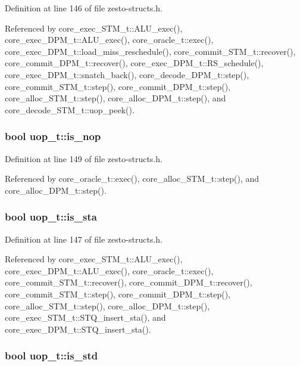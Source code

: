 Definition at line 146 of file zesto-structs.h.

Referenced by core\_\-exec\_\-STM\_\-t::ALU\_\-exec(), core\_\-exec\_\-DPM\_\-t::ALU\_\-exec(), core\_\-oracle\_\-t::exec(), core\_\-exec\_\-DPM\_\-t::load\_\-miss\_\-reschedule(), core\_\-commit\_\-STM\_\-t::recover(), core\_\-commit\_\-DPM\_\-t::recover(), core\_\-exec\_\-DPM\_\-t::RS\_\-schedule(), core\_\-exec\_\-DPM\_\-t::snatch\_\-back(), core\_\-decode\_\-DPM\_\-t::step(), core\_\-commit\_\-STM\_\-t::step(), core\_\-commit\_\-DPM\_\-t::step(), core\_\-alloc\_\-STM\_\-t::step(), core\_\-alloc\_\-DPM\_\-t::step(), and core\_\-decode\_\-STM\_\-t::uop\_\-peek().
\subsubsection[{is\_\-nop}]{\setlength{\rightskip}{0pt plus 5cm}bool {\bf uop\_\-t::is\_\-nop}}\label{structuop__t_56a6fccbcaa70ed56ccb4fa52fe57cb0}




Definition at line 149 of file zesto-structs.h.

Referenced by core\_\-oracle\_\-t::exec(), core\_\-alloc\_\-STM\_\-t::step(), and core\_\-alloc\_\-DPM\_\-t::step().
\subsubsection[{is\_\-sta}]{\setlength{\rightskip}{0pt plus 5cm}bool {\bf uop\_\-t::is\_\-sta}}\label{structuop__t_eec85d8cffdbdff59e335df7cf38174a}




Definition at line 147 of file zesto-structs.h.

Referenced by core\_\-exec\_\-STM\_\-t::ALU\_\-exec(), core\_\-exec\_\-DPM\_\-t::ALU\_\-exec(), core\_\-oracle\_\-t::exec(), core\_\-commit\_\-STM\_\-t::recover(), core\_\-commit\_\-DPM\_\-t::recover(), core\_\-commit\_\-STM\_\-t::step(), core\_\-commit\_\-DPM\_\-t::step(), core\_\-alloc\_\-STM\_\-t::step(), core\_\-alloc\_\-DPM\_\-t::step(), core\_\-exec\_\-STM\_\-t::STQ\_\-insert\_\-sta(), and core\_\-exec\_\-DPM\_\-t::STQ\_\-insert\_\-sta().
\subsubsection[{is\_\-std}]{\setlength{\rightskip}{0pt plus 5cm}bool {\bf uop\_\-t::is\_\-std}}\label{structuop__t_85d4bc293425ae1bcd322b314414ce1b}




